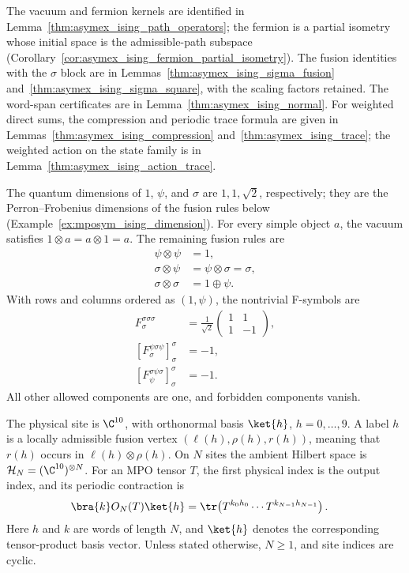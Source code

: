 The vacuum and fermion kernels are identified in
Lemma~\ref{thm:asymex_ising_path_operators}; the fermion is a partial
isometry whose initial space is the admissible-path subspace
(Corollary~\ref{cor:asymex_ising_fermion_partial_isometry}). The fusion
identities with the $\sigma$ block are in
Lemmas~\ref{thm:asymex_ising_sigma_fusion}
and~\ref{thm:asymex_ising_sigma_square}, with the scaling factors retained.
The word-span certificates are in Lemma~\ref{thm:asymex_ising_normal}.
For weighted direct sums, the compression and periodic trace formula
are given in Lemmas~\ref{thm:asymex_ising_compression}
and~\ref{thm:asymex_ising_trace}; the weighted action on the state
family is in Lemma~\ref{thm:asymex_ising_action_trace}.

The quantum dimensions of $1$, $\psi$, and $\sigma$ are $1,1,\sqrt2$,
respectively; they are the Perron--Frobenius dimensions of the fusion rules
below (Example~\ref{ex:mposym_ising_dimension}). For every simple object
$a$, the vacuum satisfies $1\otimes a=a\otimes1=a$. The remaining fusion
rules are
\begin{align}
    \psi\otimes\psi     & =1,                        \\
    \sigma\otimes\psi   & =\psi\otimes\sigma=\sigma, \\
    \sigma\otimes\sigma & =1\oplus\psi.
\end{align}
With rows and columns ordered as $(1,\psi)$, the nontrivial F-symbols are
\begin{align}
    F^{\sigma\sigma\sigma}_{\sigma}
                                                    & =\frac{1}{\sqrt2}
    \begin{pmatrix}1&1\\1&-1\end{pmatrix},                              \\
    [F^{\psi\sigma\psi}_{\sigma}]_{\sigma}^{\sigma} & =-1,              \\
    [F^{\sigma\psi\sigma}_{\psi}]_{\sigma}^{\sigma} & =-1.
\end{align}
All other allowed components are one, and forbidden components vanish.

The physical site is $\C^{10}$, with orthonormal basis $\ket{h}$,
$h=0,\ldots,9$. A label $h$ is a locally admissible fusion vertex
$(\ell(h),\rho(h),r(h))$, meaning that $r(h)$ occurs in
$\ell(h)\otimes\rho(h)$. On $N$ sites the ambient Hilbert space is
$\mathcal H_N=(\C^{10})^{\otimes N}$.
For an MPO tensor $T$, the first physical index is the output index,
and its periodic contraction is
\begin{align}
    \bra{k}O_N(T)\ket{h}
     & =\tr\!\left(T^{k_0h_0}\cdots T^{k_{N-1}h_{N-1}}\right).
    \label{eq:asymex_ising_periodic}
\end{align}
Here $h$ and $k$ are words of length $N$, and $\ket{h}$ denotes the
corresponding tensor-product basis vector. Unless stated otherwise,
$N\geq1$, and site indices are cyclic.

